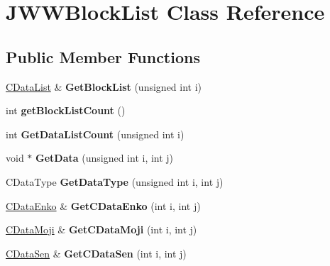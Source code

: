 \hypertarget{classJWWBlockList}{\section{J\-W\-W\-Block\-List Class Reference}
\label{classJWWBlockList}
}
\subsection*{Public Member Functions}
\begin{DoxyCompactItemize}
\item 
\hypertarget{classJWWBlockList_a8973cb2421e3dc6fadc207aec98ca0d4}{\hyperlink{classCDataList}{C\-Data\-List} \& {\bfseries Get\-Block\-List} (unsigned int i)}\label{classJWWBlockList_a8973cb2421e3dc6fadc207aec98ca0d4}

\item 
\hypertarget{classJWWBlockList_a70249c5324529a03b6216838c00b9d5d}{int {\bfseries get\-Block\-List\-Count} ()}\label{classJWWBlockList_a70249c5324529a03b6216838c00b9d5d}

\item 
\hypertarget{classJWWBlockList_ab999c8bac702136bb67d516c3edc8a64}{int {\bfseries Get\-Data\-List\-Count} (unsigned int i)}\label{classJWWBlockList_ab999c8bac702136bb67d516c3edc8a64}

\item 
\hypertarget{classJWWBlockList_a12462a964a90ab165a4a020beb67a6dd}{void $\ast$ {\bfseries Get\-Data} (unsigned int i, int j)}\label{classJWWBlockList_a12462a964a90ab165a4a020beb67a6dd}

\item 
\hypertarget{classJWWBlockList_a5bb3d4b370abe127a2106780a8bdad45}{C\-Data\-Type {\bfseries Get\-Data\-Type} (unsigned int i, int j)}\label{classJWWBlockList_a5bb3d4b370abe127a2106780a8bdad45}

\item 
\hypertarget{classJWWBlockList_ab174727f74884c981683e84908de0bbd}{\hyperlink{classCDataEnko}{C\-Data\-Enko} \& {\bfseries Get\-C\-Data\-Enko} (int i, int j)}\label{classJWWBlockList_ab174727f74884c981683e84908de0bbd}

\item 
\hypertarget{classJWWBlockList_af16dcc7c25cfb41e3bb4bb0828c31e63}{\hyperlink{classCDataMoji}{C\-Data\-Moji} \& {\bfseries Get\-C\-Data\-Moji} (int i, int j)}\label{classJWWBlockList_af16dcc7c25cfb41e3bb4bb0828c31e63}

\item 
\hypertarget{classJWWBlockList_ad1a31763921e0b7ef15ae58d4dd54920}{\hyperlink{classCDataSen}{C\-Data\-Sen} \& {\bfseries Get\-C\-Data\-Sen} (int i, int j)}\label{classJWWBlockList_ad1a31763921e0b7ef15ae58d4dd54920}


\end{DoxyCompactItemize}
